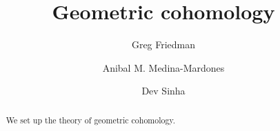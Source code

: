 \documentclass{amsart}
\title{Geometric cohomology}
\author[G. Friedman]{Greg Friedman}
\author[A. Medina-Mardones]{Anibal M. Medina-Mardones}
\author[D. Sinha]{Dev Sinha}
\theoremstyle{definition}
\begin{document}
	\begin{abstract}
		We set up the theory of geometric cohomology.
	\end{abstract}
	\maketitle
	\tableofcontents

	

	
	

	\pagebreak
\end{document}
